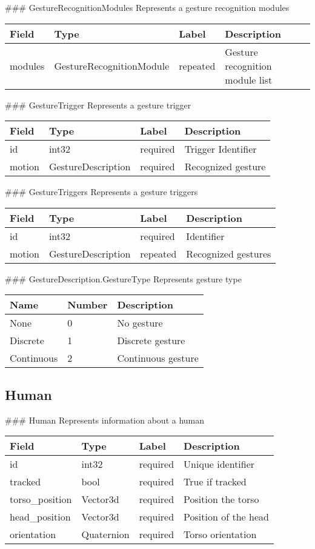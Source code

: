  \#\#\# GestureRecognitionModules Represents a gesture recognition
modules

\begin{longtable}[l]{@{}llll@{}}
\toprule
Field & Type & Label & Description\tabularnewline
\midrule
\endhead
modules & GestureRecognitionModule & repeated & Gesture recognition
module list\tabularnewline
\bottomrule
\end{longtable}

 \#\#\# GestureTrigger Represents a gesture trigger

\begin{longtable}[l]{@{}llll@{}}
\toprule
Field & Type & Label & Description\tabularnewline
\midrule
\endhead
id & int32 & required & Trigger Identifier\tabularnewline
motion & GestureDescription & required & Recognized
gesture\tabularnewline
\bottomrule
\end{longtable}

 \#\#\# GestureTriggers Represents a gesture triggers

\begin{longtable}[l]{@{}llll@{}}
\toprule
Field & Type & Label & Description\tabularnewline
\midrule
\endhead
id & int32 & required & Identifier\tabularnewline
motion & GestureDescription & repeated & Recognized
gestures\tabularnewline
\bottomrule
\end{longtable}

 \#\#\# GestureDescription.GestureType Represents gesture type

\begin{longtable}[l]{@{}lll@{}}
\toprule
Name & Number & Description\tabularnewline
\midrule
\endhead
None & 0 & No gesture\tabularnewline
Discrete & 1 & Discrete gesture\tabularnewline
Continuous & 2 & Continuous gesture\tabularnewline
\bottomrule
\end{longtable}

 \subsection{Human}\label{human.proto}

 \#\#\# Human Represents information about a human

\begin{longtable}[l]{@{}llll@{}}
\toprule
Field & Type & Label & Description\tabularnewline
\midrule
\endhead
id & int32 & required & Unique identifier\tabularnewline
tracked & bool & required & True if tracked\tabularnewline
torso\_position & Vector3d & required & Position the
torso\tabularnewline
head\_position & Vector3d & required & Position of the
head\tabularnewline
orientation & Quaternion & required & Torso orientation\tabularnewline
\bottomrule
\end{longtable}

